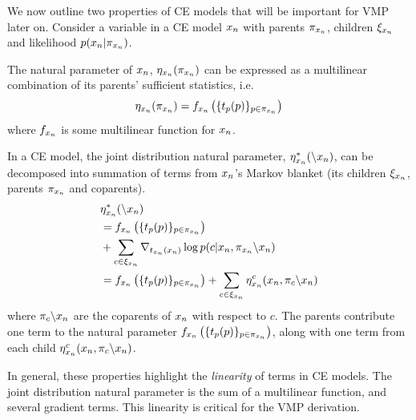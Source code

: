 We now outline two properties of CE models
that will be important for VMP later on.
Consider a variable in a CE model $x_n$ with
parents $\pi_{x_n}$, children $\xi_{x_n}$
and likelihood $p(x_n | \pi_{x_n})$.
\begin{property}
\label{prop:multilinear}
The natural parameter of $x_n$, $\eta_{x_n}(\pi_{x_n})$
can be expressed as a multilinear combination
of its parents' sufficient statistics, i.e.
\begin{equation}
    \eta_{x_n}(\pi_{x_n}) = f_{x_n}\left(\{t_p(p)\}_{p \in \pi_{x_n}}\right)
\end{equation}
where $f_{x_n}$ is some multilinear function for $x_n$.
\end{property}



\begin{property}
\label{prop:jointparam}
In a CE model,
the joint distribution natural parameter, $\eta^*_{x_n}(\backslash x_n)$,
can be decomposed into summation of terms from $x_n$'s Markov blanket
(its children $\xi_{x_n}$, parents $\pi_{x_n}$ and coparents).
\begin{equation}
\begin{split}
    &\eta^*_{x_n}(\backslash x_n) \\
    &= f_{x_n}\left(\{t_p(p)\}_{p \in \pi_{x_n}}\right)\\
    &+ \sum_{c \in \xi_{x_n}} \nabla_{t_{x_n}(x_n)}\log p(c | x_n, \pi_{x_n} \backslash x_n)\\
    &= f_{x_n}\left(\{t_p(p)\}_{p \in \pi_{x_n}}\right)
    + \sum_{c \in \xi_{x_n}} \eta^c_{x_n}(x_n, \pi_c \backslash x_n)
\end{split}
\end{equation}
where $\pi_c \backslash x_n$ are the coparents of $x_n$ with respect to $c$.
The parents contribute one term to the natural parameter $f_{x_n}\left(\{t_p(p)\}_{p \in \pi_{x_n}}\right)$, along with one
term from each child $\eta^c_{x_n}(x_n, \pi_c \backslash x_n)$.

\end{property}
In general, these properties highlight the \emph{linearity} of terms
in CE models. The joint distribution natural parameter
is the sum of a multilinear function,
and several gradient terms.
This linearity is critical for the VMP derivation.


